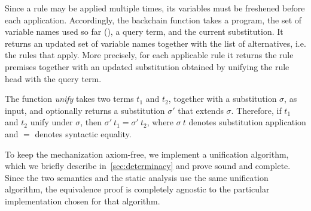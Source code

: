 Since a rule may be applied multiple times, its variables must be
freshened before each application. Accordingly, the backchain function
takes a program, the set of variable names used so far (\FV), a
query term, and the current substitution. It returns an updated
set of variable names together with the list of alternatives, i.e. the
rules that apply. More precisely, for each applicable rule it returns the
rule premises together with an updated substitution obtained by unifying
the rule head with the query term.

The function \emph{unify} takes two terms $t_1$ and $t_2$, together with a
substitution $\sigma$, as input, and optionally returns a substitution
$\sigma'$ that extends $\sigma$. Therefore, if $t_1$ and $t_2$ unify
under $\sigma$, then $\sigma'~t_1 = \sigma'~t_2$, where
$\sigma~t$ denotes substitution application and $=$ denotes 
syntactic equality.

To keep the mechanization axiom-free, we implement a unification
algorithm, which we briefly describe in~\cref{sec:determinacy} and prove
sound and complete.
Since the two semantics and the static analysis use the same
unification algorithm, the equivalence proof is completely agnostic to
the particular implementation chosen for that algorithm.

% 



%   

%     
%     



